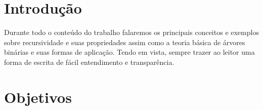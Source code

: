 \documentclass[
	12pt,				%
	oneside,   	        %
	a4paper,			%
	chapter=TITLE,		%
	section=TITLE,		%
	subsection=TITLE,	%
	subsubsection=TITLE,%
	english,			%
	french,				%
	spanish,			%
	brazil,				%
	]{pacotes/abntex2}
\begin{document}



  
 
 


\textual

\makeatletter
\renewcommand{\chapter}{\@gobbletwo}
\makeatother

\section{\textbf{Introdução}}
\label{sec:introducao}

Durante todo o conteúdo do trabalho falaremos os principais conceitos e exemplos sobre recursividade e suas propriedades assim como a teoria básica de árvores binárias e suas formas de aplicação. Tendo em vista, sempre trazer ao leitor uma forma de escrita de fácil entendimento e transparência.

\section{\textbf{Objetivos}}
\label{sec: objetivos}
\end{document}
